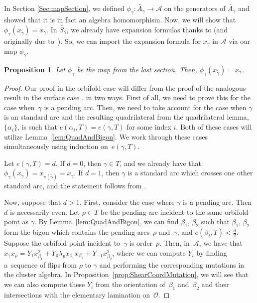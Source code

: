 \documentclass[pdftex]{sigma}%
\numberwithin{equation}{section}
\newtheorem{Proposition}[Theorem]{Proposition}
\begin{document}
In Section \ref{Sec:mapSection}, we defined $\phi_\gamma\colon \widetilde{A_\gamma} \to \mathcal{A}$ on the generators of $\widetilde{A_\gamma}$ and showed that it is in fact an algebra homomorphism. Now, we will show that $\phi_\gamma(x_{\widetilde{\gamma}}) = x_\gamma$. In $\widetilde{S_\gamma}$, we already have expansion formulas thanks to \cite{MSW} (and originally due to~\cite{Musiker-Schiffler}). So, we can import the expansion formula for $x_\gamma$ in $\mathcal{A}$ via our map $\phi_\gamma$.

\begin{Proposition}\label{Proposition5}
Let $\phi_\gamma$ be the map from the last section. Then, $\phi_\gamma(x_{\widetilde{\gamma}}) = x_\gamma$.
\end{Proposition}

\begin{proof}Our proof in the orbifold case will differ from the proof of the analogous result in the surface case \cite[Theorem~10.1]{MSW}, in two ways. First of all, we need to prove this for the case when~$\gamma$ is a pending arc. Then, we need to take account for the case when $\gamma$ is an standard arc and the resulting quadrilateral from the quadrilateral lemma, $\{\alpha_i\}$, is such that $e(\alpha_i,T) = e(\gamma,T)$ for some index $i$. Both of these cases will utilize Lemma~\ref{lem:QuadAndBigon}. We work through these cases simultaneously using induction on~$e(\gamma,T)$.

Let $e(\gamma,T) = d$. If $d = 0$, then $\gamma \in T$, and we already have that $\phi_\gamma(x_{\widetilde{\gamma}}) = x_{\pi(\widetilde{\gamma})} = x_\gamma$. If $d = 1$, then $\gamma$ is a standard arc which crosses one other standard arc, and the statement follows from \cite[Theorem~10.1]{MSW}.

Now, suppose that $d>1$. First, consider the case where $\gamma$ is a pending arc. Then $d$ is necessarily even. Let $\rho \in T$ be the pending arc incident to the same orbifold point as $\gamma$. By Lemma~\ref{lem:QuadAndBigon}, we can find $\beta_1$, $\beta_2$ such that $\beta_1$, $\beta_2$ form the bigon which contains the pending arcs~$\rho$ and~$\gamma$, and $e(\beta_i, T) < \frac{d}{2}$. Suppose the orbifold point incident to~$\gamma$ is order~$p$. Then, in~$\mathcal{A}$, we have that $x_\gamma x_\rho = Y_1 x_{\beta_1}^2 + Y_0 \lambda_p x_{\beta_1} x_{\beta_2} + Y_{-1} x_{\beta_2}^2$, where we can compute $Y_i$ by finding a~sequence of flips from $\rho$ to $\gamma$ and performing the corresponding mutations in the cluster algebra. In Proposition~\ref{prop:ShearCoordMutation}, we will see that we can also compute these $Y_i$ from the orientation of~$\beta_1$ and~$ \beta_2$ and their intersections with the elementary lamination on~$\mathcal{O}$.


\end{proof}
\end{document}
